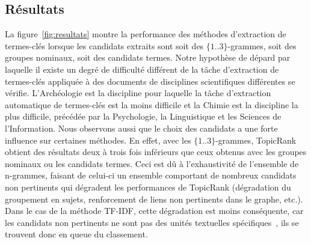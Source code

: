   \subsection{Résultats}
  \label{subsec:resultats}
    La figure~\ref{fig:resultats} montre la performance des méthodes
    d'extraction de termes-clés lorsque les candidats extraits sont soit des
    $\{1..3\}$-grammes, soit des groupes nominaux, soit des candidats termes.
    Notre hypothèse de dépard par laquelle il existe un degré de difficulté
    différent de la tâche d'extraction de termes-clés appliquée à des documents
    de disciplines scientifiques différentes se vérifie.
    L'Archéologie
    est la discipline pour laquelle la tâche d'extraction automatique de
    termes-clés est la moins difficile et la Chimie est la discipline la plus
    difficile, précédée par la Psychologie, la Linguistique et les Sciences de
    l'Information.
    Nous observons aussi que le choix des candidats a une forte influence sur
    certaines méthodes. En effet, avec les $\{1..3\}$-grammes, TopicRank obtient
    des résultats deux à trois fois inférieurs que ceux obtenus avec les groupes
    nominaux ou les candidats termes. Ceci est dû à l'exhaustivité de l'ensemble
    de n-grammes, faisant de celui-ci un ensemble comportant de nombreux
    candidats non pertinents qui dégradent les performances de TopicRank
    (dégradation du groupement en sujets, renforcement de liens non pertinents
    dans le graphe, etc.). Dans le cas de la méthode TF-IDF, cette dégradation
    est moins conséquente, car les candidats non pertinents ne sont pas des
    unités textuelles spécifiques~\cite{kim2009termextraction}, ils se trouvent
    donc en queue du classement.
